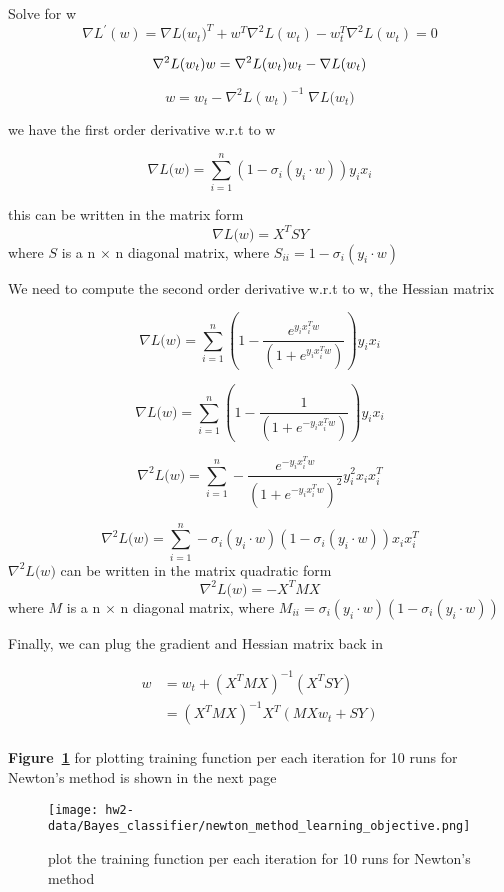 \documentclass[11pt]{report}
\begin{document}
\justify Solve for w
\[
\nabla{L^{'}(w)} =  \nabla{L(w_{t}})^{T} + w^{T} \nabla^{2}{L(w_{t})} - w_{t}^{T} \nabla^{2}{L(w_{t})} = 0
\]

\[
\nabla^{2}{L(w_{t})}  w =   \nabla^{2}{L(w_{t})} w_{t} - \nabla{L(w_{t}})  \\
\]

\[
w=  w_{t} - \nabla^{2}{L(w_{t})}^{-1} \; \nabla{L(w_{t}}) 
\]

\justify we have the first order derivative w.r.t to w 

\[
\nabla{L(w}) = \sum_{i=1}^{n} (1 - \sigma_{i}(y_{i} \cdot w)) y_{i} x_{i}
\]

\justify this can be written in the matrix form
\[
\nabla{L(w}) = X^{T}SY
\]
where $S$ is a n $\times$ n diagonal matrix, where $S_{ii} = 1 - \sigma_{i} ({y_{i} \cdot w})$

\-
\justify We need to compute the second order derivative w.r.t to w, the Hessian matrix

\[
\nabla{L(w}) = \sum_{i=1}^{n} (1 - \frac{e^{y_{i} x_{i}^{T} w}} {(1 + e^{y_{i} x_{i}^{T} w})} ) y_{i} x_{i}
\]

\[
\nabla{L(w}) = \sum_{i=1}^{n} ( 1 - \frac{1} {(1 + e^{-y_{i} x_{i}^{T} w})} ) y_{i} x_{i}
\]

\[
\nabla^{2}{L(w}) = \sum_{i=1}^{n} - \frac{ e^{-y_{i} x_{i}^{T} w } } {(1 + e^{-y_{i} x_{i}^{T} w})^{2}}  y_{i}^{2} x_{i} x_{i}^{T}
\]

\[
\nabla^{2}{L(w}) = \sum_{i=1}^{n} - \sigma_{i} ({y_{i} \cdot w})( 1 - \sigma_{i} ({y_{i} \cdot w})) x_{i} x_{i}^{T}
\]
\-
\justify $\nabla^{2}{L(w})$ can be written in the matrix quadratic form 
\[
\nabla^{2}{L(w}) = - X^{T} M X
\]
where $M$ is a n $\times$ n diagonal matrix, where $M_{ii} = \sigma_{i} ({y_{i} \cdot w})( 1 - \sigma_{i} ({y_{i} \cdot w}))$

\-
\justify Finally, we can plug the gradient and Hessian matrix back in

\begin{align*}
w &=  w_{t} + (X^{T} M X)^{-1} (X^{T}SY)\\
&=  (X^{T} M X)^{-1} X^{T} (M X w_{t} + SY)\\
\end{align*}

\-
\justify \textbf{Figure~\ref{fig:newton_method_learning_objective}} for plotting training function per each iteration for 10 runs for Newton's method is shown in the next page

\begin{figure}[h]
\texttt{[image: hw2-data/Bayes\_classifier/newton\_method\_learning\_objective.png]}
\centering
\caption{plot the training function per each iteration for 10 runs for Newton's method}
\label{fig:newton_method_learning_objective}
\end{figure}
\end{document}
